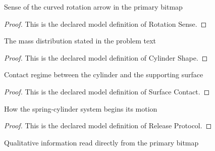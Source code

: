 \begin{definition}
  \label{def:physics:phyx-mini-0279:phyxminiproblems-problemphyxmini0279-rotationsense}
  Sense of the curved rotation arrow in the primary bitmap
\end{definition}
\begin{proof}
  This is the declared model definition of Rotation Sense.
\end{proof}
\begin{definition}
  \label{def:physics:phyx-mini-0279:phyxminiproblems-problemphyxmini0279-cylindershape}
  The mass distribution stated in the problem text
\end{definition}
\begin{proof}
  This is the declared model definition of Cylinder Shape.
\end{proof}
\begin{definition}
  \label{def:physics:phyx-mini-0279:phyxminiproblems-problemphyxmini0279-surfacecontact}
  Contact regime between the cylinder and the supporting surface
\end{definition}
\begin{proof}
  This is the declared model definition of Surface Contact.
\end{proof}
\begin{definition}
  \label{def:physics:phyx-mini-0279:phyxminiproblems-problemphyxmini0279-releaseprotocol}
  How the spring-cylinder system begins its motion
\end{definition}
\begin{proof}
  This is the declared model definition of Release Protocol.
\end{proof}
\begin{definition}
  \label{def:physics:phyx-mini-0279:phyxminiproblems-problemphyxmini0279-rollingcylinderfigure}
  Qualitative information read directly from the primary bitmap
\end{definition}
